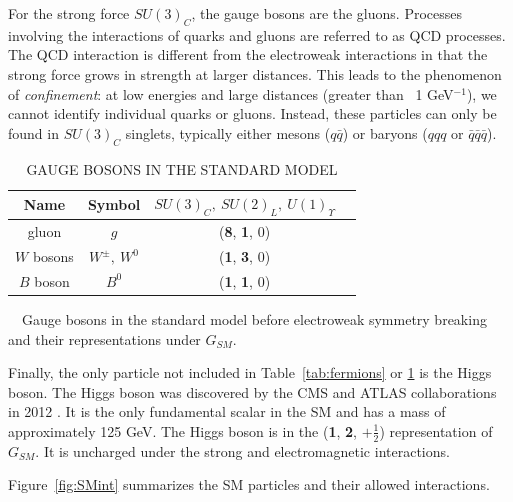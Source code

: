 For the strong force $SU(3)_C$, the gauge bosons are the gluons. Processes involving the interactions of quarks and gluons are referred to as QCD processes. The QCD interaction is different from the electroweak interactions in that the strong force grows in strength at larger distances. This leads to the phenomenon of \textit{confinement}: at low energies and large distances (greater than ~1 GeV$^{-1}$), we cannot identify individual quarks or gluons. Instead, these particles can only be found in $SU(3)_C$ singlets, typically either mesons ($q\bar{q}$) or baryons ($qqq$ or $\bar{q}\bar{q}\bar{q}$). 

\begin{table}[ht]
    \caption{GAUGE BOSONS IN THE STANDARD MODEL}
    \centering
    \begin{threeparttable}
    \begin{tabular}{|c|c|c|c|}
    \hline
    \hline
    Name  & Symbol & $SU(3)_C,~SU(2)_L,~U(1)_\Upsilon $\\
  	  \hline
           \hline    
gluon         & $g$   & (\textbf{8}, \textbf{1}, 0) \\
\hline
$W$ bosons & $W^\pm,~W^0$ & (\textbf{1}, \textbf{3}, 0) \\
\hline
$B$ boson & $B^0$ & (\textbf{1}, \textbf{1}, 0) \\
           \hline
           \hline
    \end{tabular}
    \label{tab:bosons}
\begin{tablenotes}
\setlength{}
\footnotesize
\item ~~Gauge bosons in the standard model before electroweak symmetry breaking and their representations under $G_{SM}$. 
\end{tablenotes}
\end{threeparttable}
\end{table}

Finally, the only particle not included in Table~\ref{tab:fermions} or \ref{tab:bosons} is the Higgs boson. The Higgs boson was discovered by the CMS and ATLAS collaborations in 2012 \cite{ATLASHiggs,CMSHiggs}. %
It is the only fundamental scalar in the SM and has a mass of approximately 125 GeV. The Higgs boson is in the (\textbf{1}, \textbf{2}, $+\frac{1}{2}$) representation of $G_{SM}$. It is uncharged under the strong and electromagnetic interactions. 

Figure~\ref{fig:SMint} summarizes the SM particles and their allowed interactions.

